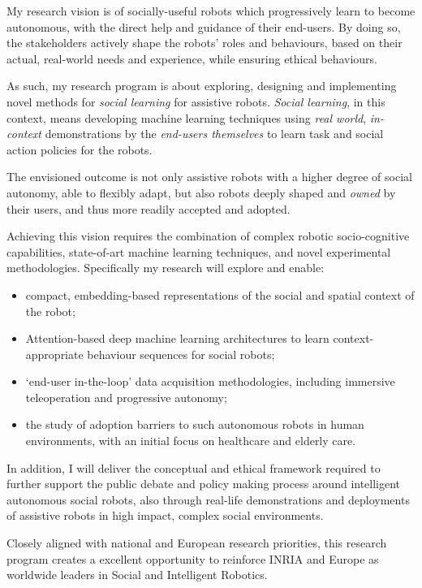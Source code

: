 \begin{framed}
\bf

\noindent My research vision is of socially-useful robots which
progressively learn to become autonomous, with the direct help and guidance
of their end-users. By doing so, the stakeholders actively shape the robots'
roles and behaviours, based on their actual, real-world needs and
experience, while ensuring ethical behaviours.

\noindent As such, my research program is about exploring, designing and
implementing novel methods for \emph{social learning} for assistive robots.
\emph{Social learning}, in this context, means developing machine learning
techniques using \emph{real world}, \emph{in-context} demonstrations by the
\emph{end-users themselves} to learn task and social action policies for the
robots.

\vspace{0.4em}


\noindent The envisioned outcome is not only assistive robots with a higher
degree of social autonomy, able to flexibly adapt, but also robots deeply
shaped and \emph{owned} by their users, and thus more readily accepted and adopted.

\vspace{0.4em}
Achieving this vision requires the combination of complex robotic socio-cognitive
capabilities, state-of-art machine learning techniques, and novel
experimental methodologies. Specifically my research will explore and enable:

\begin{itemize}
        \item compact, embedding-based representations of the social and spatial
            context of the robot;
        \item Attention-based deep machine learning architectures to learn
            context-appropriate behaviour sequences for social robots;        
        \item `end-user in-the-loop' data acquisition methodologies, including
            immersive teleoperation and progressive autonomy;
        \item the study of adoption barriers to such autonomous robots in
            human environments, with an initial focus on healthcare and elderly
            care.
\end{itemize}


\vspace{0.4em}
\noindent In addition, I will deliver the conceptual and ethical framework
required to further support the public debate and policy making process
around intelligent autonomous social robots, also through real-life demonstrations and
    deployments of assistive robots in high impact, complex social environments.

\vspace{0.4em}
\noindent Closely aligned with national and European research priorities,
this research program creates a excellent opportunity to reinforce INRIA and
Europe as worldwide leaders in Social and Intelligent Robotics.

\end{framed}


